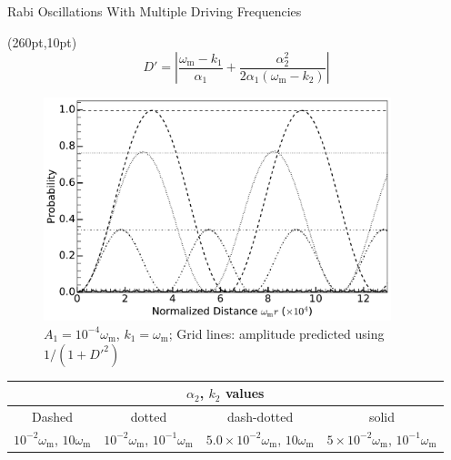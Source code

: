 \documentclass[9pt]{beamer}
\begin{document}
\begin{darkframes}
\begin{frame}{Rabi Oscillations With Multiple Driving Frequencies}
\begin{textblock*}{100pt}(260pt,10pt)
\tiny
\begin{equation*}
D' =  \left\vert \frac{\omega_{\mathrm m} - k_1 }{\alpha_1} + \frac{\alpha_2^2}{2\alpha_1(\omega_{\mathrm m}-k_2)} \right\vert
\end{equation*}
\end{textblock*}


\begin{figure}
\includegraphics[width=0.9\textwidth]{assets/interference-reduction}
\caption*{$A_1=10^{-4}\omega_{\mathrm m}$, $k_1= \omega_{\mathrm m}$; Grid lines: amplitude predicted using $1/(1+D'^2)$
}
\end{figure}


{\tiny
\vspace{-15pt}
\begin{center}
    \begin{tabular}{c|c|c|c}
    \multicolumn{4}{c}{ $\alpha_2$, $k_2$ values} \\
    \hline
       Dashed  &  dotted & dash-dotted & solid \\
       $10^{-2}\omega_{\mathrm{m}}$, $10\omega_{\mathrm m}$  &  $10^{-2}\omega_{\mathrm{m}}$, $10^{-1}\omega_{\mathrm m}$  & $5.0\times 10^{-2}\omega_{\mathrm{m}}$, $10\omega_{\mathrm m}$  & $5\times 10^{-2}\omega_{\mathrm{m}}$, $10^{-1}\omega_{\mathrm m}$
    \end{tabular}
\end{center}
}


\end{frame}
\end{darkframes}
\end{document}
